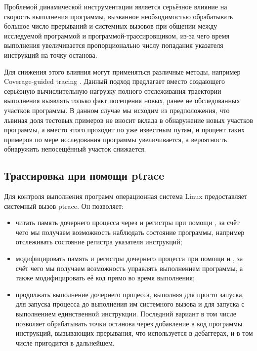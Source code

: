 Проблемой динамической инструментации является серьёзное влияние на скорость выполнения программы, вызванное необходимостью обрабатывать большое число прерываний и системных вызовов при общении между исследуемой программой и программой-трассировщиком, из-за чего время выполнения увеличивается пропорционально числу попадания указателя инструкций на точку останова.

Для снижения этого влияния могут применяться различные методы, например Coverage-guided tracing \cite{full-speed-fuzzing}. Данный подход предлагает вместо создающего серьёзную вычислительную нагрузку полного отслеживания траектории выполнения выявлять только факт посещения новых, ранее не обследованных участков программы. В данном случае мы исходим из предположения, что львиная доля тестовых примеров не вносит вклада в обнаружение новых участков программы, а вместо этого проходит по уже известным путям, и процент таких примеров по мере исследования программы увеличивается, а вероятность обнаружить непосещённый участок снижается.

\subsection{Трассировка при помощи ptrace}

Для контроля выполнения программ операционная система Linux предоставляет системный вызов ptrace. Он позволяет:

\begin{itemize}
	\item читать память дочернего процесса через  и регистры при помощи , за счёт чего мы получаем возможность наблюдать состояние программы, например отслеживать состояние регистра указателя инструкций;
	
	\item модифицировать память и регистры дочернего процесса при помощи  и , за счёт чего мы получаем возможность управлять выполнением программы, а также модифицировать её код прямо во время выполнения;
	
	\item продолжать выполнение дочернего процесса, выполняя  для просто запуска,  для запуска процесса до выполнения им системного вызова и  для запуска с выполнением единственной инструкции. Последний вариант в том числе позволяет обрабатывать точки останова через добавление в код программы инструкций, вызывающих прерывания, что используется в дебаггерах, и в том числе пригодится в дальнейшем.
\end{itemize}

